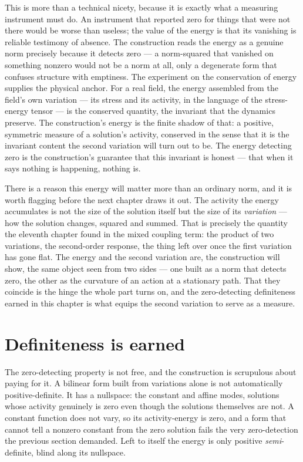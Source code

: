 This is more than a technical nicety, because it is exactly what a measuring instrument must do. An
instrument that reported zero for things that were not there would be worse than useless; the value of
the energy is that its vanishing is reliable testimony of absence. The construction reads the energy as
a genuine norm precisely because it detects zero --- a norm-squared that vanished on something nonzero
would not be a norm at all, only a degenerate form that confuses structure with emptiness. The
experiment on the conservation of energy supplies the physical anchor. For a real field, the energy
assembled from the field's own variation --- its stress and its activity, in the language of the
stress-energy tensor --- is the conserved quantity, the invariant that the dynamics preserve. The
construction's energy is the finite shadow of that: a positive, symmetric measure of a solution's
activity, conserved in the sense that it is the invariant content the second variation will turn out to
be. The energy detecting zero is the construction's guarantee that this invariant is honest --- that
when it says nothing is happening, nothing is.

There is a reason this energy will matter more than an ordinary norm, and it is worth flagging before
the next chapter draws it out. The activity the energy accumulates is not the size of the solution
itself but the size of its \emph{variation} --- how the solution changes, squared and summed. That is
precisely the quantity the eleventh chapter found in the mixed coupling term: the product of two
variations, the second-order response, the thing left over once the first variation has gone flat. The
energy and the second variation are, the construction will show, the same object seen from two sides ---
one built as a norm that detects zero, the other as the curvature of an action at a stationary path.
That they coincide is the hinge the whole part turns on, and the zero-detecting definiteness earned in
this chapter is what equips the second variation to serve as a measure.

\section{Definiteness is earned}
\label{se:definiteness-is-earned}

The zero-detecting property is not free, and the construction is scrupulous about paying for it. A
bilinear form built from variations alone is not automatically positive-definite. It has a nullspace:
the constant and affine modes, solutions whose activity genuinely is zero even though the solutions
themselves are not. A constant function does not vary, so its activity-energy is zero, and a form that
cannot tell a nonzero constant from the zero solution fails the very zero-detection the previous section
demanded. Left to itself the energy is only positive \emph{semi}-definite, blind along its nullspace.

